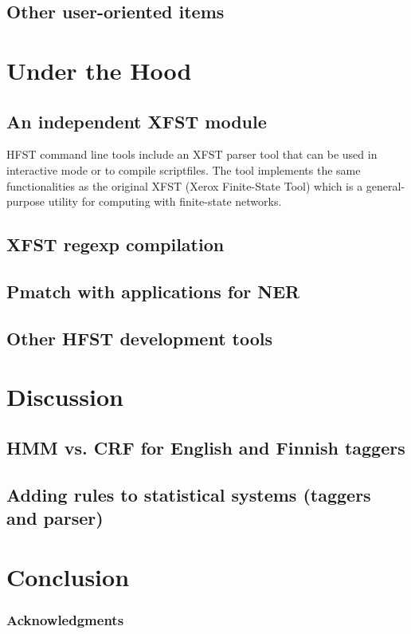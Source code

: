 \documentclass{llncs}
\begin{document}
\subsection{Other user-oriented items}

\section{Under the Hood}

\subsection{An independent XFST module}

HFST command line tools include an XFST parser tool that can be used in interactive
mode or to compile scriptfiles. The tool implements the same functionalities as the
original XFST (Xerox Finite-State Tool) which is a general-purpose utility for computing
with finite-state networks.


\subsection{XFST regexp compilation}

\subsection{Pmatch with applications for NER}

\subsection{Other HFST development tools}

\section{Discussion}\label{hfst:discussion}

\subsection{HMM vs. CRF for English and Finnish taggers}

\subsection{Adding rules to statistical systems (taggers and parser)}

\section{Conclusion}\label{hfst:conclusion}

\subsubsection*{Acknowledgments}



\end{document}
